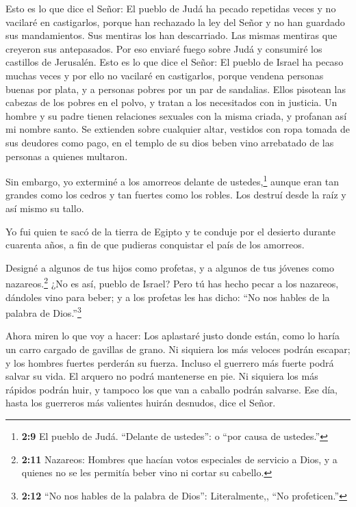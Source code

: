  Esto es lo que dice el Señor: El pueblo de Judá ha pecado
repetidas veces y no vacilaré en castigarlos, porque han rechazado la
ley del Señor y no han guardado sus mandamientos. Sus mentiras los han
descarriado. Las mismas mentiras que creyeron sus antepasados.
 Por eso enviaré fuego sobre Judá y consumiré los castillos
de Jerusalén.  Esto es lo que dice el Señor: El pueblo de
Israel ha pecaso muchas veces y por ello no vacilaré en castigarlos,
porque vendena personas buenas por plata, y a personas pobres por un par
de sandalias.  Ellos pisotean las cabezas de los pobres en
el polvo, y tratan a los necesitados con in justicia. Un hombre y su
padre tienen relaciones sexuales con la misma criada, y profanan así mi
nombre santo.  Se extienden sobre cualquier altar, vestidos
con ropa tomada de sus deudores como pago, en el templo de su dios beben
vino arrebatado de las personas a quienes multaron.

 Sin embargo, yo exterminé a los amorreos delante de
ustedes,\footnote{\textbf{2:9} El pueblo de Judá. ``Delante de
  ustedes'': o ``por causa de ustedes.''} aunque eran tan grandes como
los cedros y tan fuertes como los robles. Los destruí desde la raíz y
así mismo su tallo.

 Yo fui quien te sacó de la tierra de Egipto y te conduje
por el desierto durante cuarenta años, a fin de que pudieras conquistar
el país de los amorreos.

 Designé a algunos de tus hijos como profetas, y a algunos
de tus jóvenes como nazareos.\footnote{\textbf{2:11} Nazareos: Hombres
  que hacían votos especiales de servicio a Dios, y a quienes no se les
  permitía beber vino ni cortar su cabello.} ¿No es así, pueblo de
Israel?  Pero tú has hecho pecar a los nazareos, dándoles
vino para beber; y a los profetas les has dicho: ``No nos hables de la
palabra de Dios.''\footnote{\textbf{2:12} ``No nos hables de la palabra
  de Dios'': Literalmente,, ``No profeticen.''}

 Ahora miren lo que voy a hacer: Los aplastaré justo donde
están, como lo haría un carro cargado de gavillas de grano.
 Ni siquiera los más veloces podrán escapar; y los hombres
fuertes perderán su fuerza. Incluso el guerrero más fuerte podrá salvar
su vida.  El arquero no podrá mantenerse en pie. Ni
siquiera los más rápidos podrán huir, y tampoco los que van a caballo
podrán salvarse.  Ese día, hasta los guerreros más
valientes huirán desnudos, dice el Señor.

